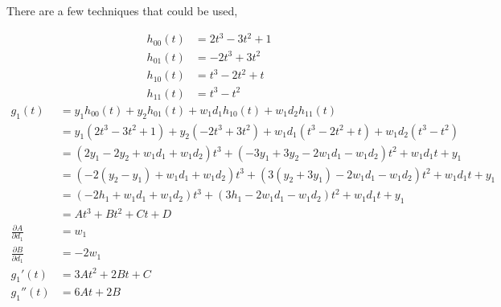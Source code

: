 \documentclass{article}
\begin{document}
There are a few techniques that could be used,

\newcommand{\dx}{\, \mathrm{d}x}
\newcommand{\dt}{\, \mathrm{d}t}
\newcommand{\dv}{\, \mathrm{d}v}
\newcommand{\du}{\, \mathrm{d}u}
\newcommand{\ddx}[1]{\frac{\mathrm{d}#1}{\mathrm{d}x}}
\newcommand{\dd}[2]{\frac{\mathrm{d}#1}{\mathrm{d}#2}}

\newpage
\begin{align*}
  h_{00}(t)
  &= 2t^3-3t^2+1 \\
  h_{01}(t)
  &= -2t^3+3t^2 \\
  h_{10}(t)
  &= t^3-2t^2+t \\
  h_{11}(t)
  &= t^3-t^2
\end{align*}
\begin{align*}
  g_1(t)
  &= y_1h_{00}(t)+y_2h_{01}(t)+w_1d_1h_{10}(t)+w_1d_2h_{11}(t) \\
  &= y_1(2t^3-3t^2+1)+y_2(-2t^3+3t^2)+w_1d_1(t^3-2t^2+t)+w_1d_2(t^3-t^2) \\
  &= (2y_1-2y_2+w_1d_1+w_1d_2)t^3+(-3y_1+3y_2-2w_1d_1-w_1d_2)t^2+w_1d_1t+y_1 \\
  &= (-2(y_2-y_1)+w_1d_1+w_1d_2)t^3+(3(y_2+3y_1)-2w_1d_1-w_1d_2)t^2+w_1d_1t+y_1 \\
  &= (-2h_1+w_1d_1+w_1d_2)t^3+(3h_1-2w_1d_1-w_1d_2)t^2+w_1d_1t+y_1 \\
  &= At^3+Bt^2+Ct+D \\
  \frac{\partial A}{\partial d_1}
  &= w_1 \\
  \frac{\partial B}{\partial d_1}
  &= -2w_1 \\
  g_1'(t)
  &= 3At^2+2Bt+C \\
  g_1''(t)
  &= 6At+2B
\end{align*}
\end{document}
